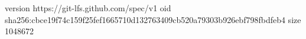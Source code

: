 version https://git-lfs.github.com/spec/v1
oid sha256:cbce19f74c159f25fef1665710d132763409cb520a79303b926ebf798fbdfeb4
size 1048672
